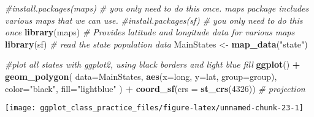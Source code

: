 \documentclass[
]{article}
\newenvironment{Shaded}{\begin{snugshade}}{\end{snugshade}}
\newcommand{\AttributeTok}[1]{\textcolor[rgb]{0.13,0.29,0.53}{#1}}
\newcommand{\CommentTok}[1]{\textcolor[rgb]{0.56,0.35,0.01}{\textit{#1}}}
\newcommand{\DecValTok}[1]{\textcolor[rgb]{0.00,0.00,0.81}{#1}}
\newcommand{\FunctionTok}[1]{\textcolor[rgb]{0.13,0.29,0.53}{\textbf{#1}}}
\newcommand{\NormalTok}[1]{#1}
\newcommand{\OtherTok}[1]{\textcolor[rgb]{0.56,0.35,0.01}{#1}}
\newcommand{\SpecialCharTok}[1]{\textcolor[rgb]{0.81,0.36,0.00}{\textbf{#1}}}
\newcommand{\StringTok}[1]{\textcolor[rgb]{0.31,0.60,0.02}{#1}}
\begin{document}
\begin{Shaded}
\begin{Highlighting}[]
\CommentTok{\#install.packages(\textquotesingle{}maps\textquotesingle{}) \# you only need to do this once. maps package includes various maps that we can use.}
\CommentTok{\#install.packages(\textquotesingle{}sf\textquotesingle{}) \# you only need to do this once}
\FunctionTok{library}\NormalTok{(maps)     }\CommentTok{\# Provides latitude and longitude data for various maps}
\FunctionTok{library}\NormalTok{(sf)}
\CommentTok{\# read the state population data}
\NormalTok{MainStates }\OtherTok{\textless{}{-}} \FunctionTok{map\_data}\NormalTok{(}\StringTok{"state"}\NormalTok{)}

\CommentTok{\#plot all states with ggplot2, using black borders and light blue fill}
\FunctionTok{ggplot}\NormalTok{() }\SpecialCharTok{+} 
  \FunctionTok{geom\_polygon}\NormalTok{( }\AttributeTok{data=}\NormalTok{MainStates, }\FunctionTok{aes}\NormalTok{(}\AttributeTok{x=}\NormalTok{long, }\AttributeTok{y=}\NormalTok{lat, }\AttributeTok{group=}\NormalTok{group),}
                \AttributeTok{color=}\StringTok{"black"}\NormalTok{, }\AttributeTok{fill=}\StringTok{"lightblue"}\NormalTok{ ) }\SpecialCharTok{+}
                \FunctionTok{coord\_sf}\NormalTok{(}\AttributeTok{crs =} \FunctionTok{st\_crs}\NormalTok{(}\DecValTok{4326}\NormalTok{)) }\CommentTok{\# projection}
\end{Highlighting}
\end{Shaded}

\begin{center}\texttt{[image: ggplot\_class\_practice\_files/figure-latex/unnamed-chunk-23-1]} \end{center}
\end{document}
